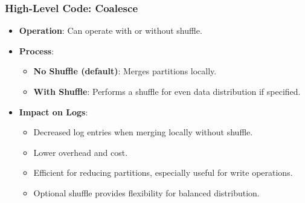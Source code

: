 \begin{frame}
    \frametitle{High-Level Code: Coalesce}

    \begin{itemize}
        \begin{itemize}
            \item \textbf{Operation}: Can operate with or without shuffle.
            \item \textbf{Process}:
            \begin{itemize}
                \item \textbf{No Shuffle (default)}: Merges partitions locally.
                \item \textbf{With Shuffle}: Performs a shuffle for even data distribution if specified.
            \end{itemize}
            \item \textbf{Impact on Logs}:
            \begin{itemize}
                \item Decreased log entries when merging locally without shuffle.
                \item Lower overhead and cost.
                \item Efficient for reducing partitions, especially useful for write operations.
                \item Optional shuffle provides flexibility for balanced distribution.
            \end{itemize}
        \end{itemize}
    \end{itemize}
\end{frame}
%
%
